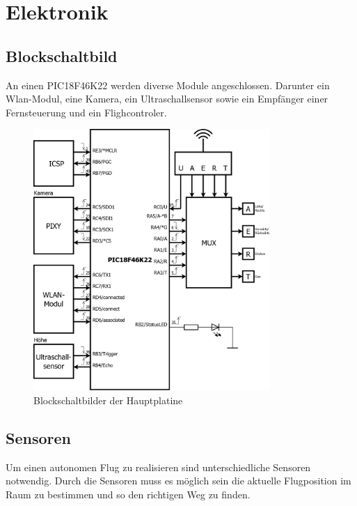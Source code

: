 \chapter{Elektronik}

\renewcommand{\kapitelautor}{Autor: Lucas Ullrich}

\section{Blockschaltbild}
An einen PIC18F46K22 werden diverse Module angeschlossen. Darunter ein Wlan-Modul, eine Kamera, ein Ultraschallsensor sowie ein Empfänger einer Fernsteuerung und ein Flighcontroler.
\begin{figure}[H]
\begin{centering}
\includegraphics[width = 0.8\textwidth]{Bilder/Blockbild}
\par\end{centering}
\caption{Blockschaltbilder der Hauptplatine}
\label{Blockschaltbild}
\end{figure}

\section{Sensoren}
Um einen autonomen Flug zu realisieren sind unterschiedliche Sensoren notwendig.
Durch die Sensoren muss es möglich sein die aktuelle Flugposition im Raum zu bestimmen und so den richtigen Weg zu finden.

